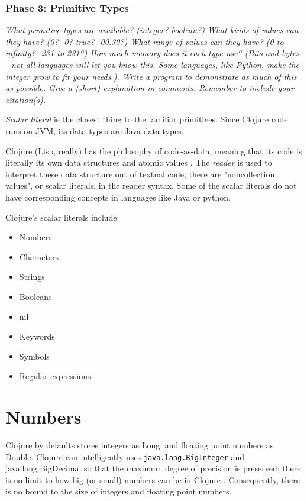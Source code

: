 \documentclass[12pt]{article}
\begin{document}

\section{Phase 3: Primitive Types} \label{rex}


{\it What primitive types are available? (integer? boolean?) What kinds of values can they have? (0? -0? true? -00.30?) What range of values can they have? (0 to infinity? -231 to 231?) How much memory does it each type use? (Bits and bytes - not all languages will let you know this. Some languages, like Python, make the integer grow to fit your needs.). Write a program to demonstrate as much of this as possible. Give a (short) explanation in comments. Remember to include your citation(s). }


{\it Scalar literal} is the closest thing to the familiar primitives. Since Clojure code runs on JVM, its data types are Java data types.


Clojure (Lisp, really) has the philosophy of code-as-data, meaning that its code is literally its own data structures and atomic values \cite{emerick2012clojure}. The {\it reader} is used to interpret these data structure out of textual code; there are "noncollection values", or scalar literals, in the reader syntax. Some of the scalar literals do not have corresponding concepts in languages like Java or python.


Clojure's scalar literals include:
\begin{itemize}
\item Numbers
\item Characters
\item Strings
\item Booleans
\item nil
\item Keywords
\item Symbols
\item Regular expressions
\end{itemize}


\part{Numbers}

Clojure by defaults stores integers as Long, and floating point numbers as Double. Clojure can intelligently uses \texttt{java.lang}\texttt{.BigInteger} and {java.lang.BigDecimal} so that the maximum degree of precision is preserved; there is no limit to how big (or small) numbers can be in Clojure \cite{fogus2011joy}. Consequently, there is no bound to the size of integers and floating point numbers.
\end{document}
